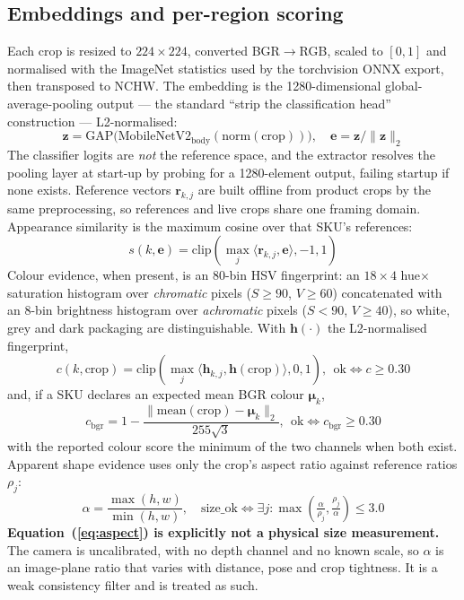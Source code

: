 \documentclass[conference]{IEEEtran}
\begin{document}
\subsection{Embeddings and per-region scoring}
Each crop is resized to $224\times224$, converted BGR$\rightarrow$RGB, scaled to $[0,1]$ and
normalised with the ImageNet statistics used by the torchvision ONNX export, then transposed to NCHW.
The embedding is the 1280-dimensional global-average-pooling output --- the standard
``strip the classification head'' construction --- L2-normalised:
\begin{equation}
\mathbf{z} = \mathrm{GAP}\big(\mathrm{MobileNetV2}_{\mathrm{body}}(\mathrm{norm}(\mathrm{crop}))\big),
\quad \mathbf{e} = \mathbf{z}/\lVert\mathbf{z}\rVert_2
\end{equation}
The classifier logits are \emph{not} the reference space, and the extractor resolves the pooling layer
at start-up by probing for a 1280-element output, failing startup if none exists. Reference vectors
$\mathbf{r}_{k,j}$ are built offline from product crops by the same preprocessing, so references and
live crops share one framing domain. Appearance similarity is the maximum cosine over that SKU's
references:
\begin{equation}
s(k,\mathbf{e}) = \mathrm{clip}\!\left(\max_j\langle\mathbf{r}_{k,j},\mathbf{e}\rangle,-1,1\right)
\end{equation}
Colour evidence, when present, is an 80-bin HSV fingerprint: an $18\times4$ hue$\times$saturation
histogram over \emph{chromatic} pixels ($S\ge90$, $V\ge60$) concatenated with an 8-bin brightness
histogram over \emph{achromatic} pixels ($S<90$, $V\ge40$), so white, grey and dark packaging are
distinguishable. With $\mathbf{h}(\cdot)$ the L2-normalised fingerprint,
\begin{equation}
c(k,\mathrm{crop}) = \mathrm{clip}\!\left(\max_j\langle\mathbf{h}_{k,j},
  \mathbf{h}(\mathrm{crop})\rangle,0,1\right),\ \ \text{ok} \iff c\ge0.30
\end{equation}
and, if a SKU declares an expected mean BGR colour $\boldsymbol{\mu}_k$,
\begin{equation}
c_{\mathrm{bgr}} = 1-\frac{\lVert\mathrm{mean}(\mathrm{crop})-\boldsymbol{\mu}_k\rVert_2}{255\sqrt{3}},
  \ \ \text{ok} \iff c_{\mathrm{bgr}}\ge0.30
\end{equation}
with the reported colour score the minimum of the two channels when both exist. Apparent shape
evidence uses only the crop's aspect ratio against reference ratios $\rho_j$:
\begin{equation}
\alpha = \frac{\max(h,w)}{\min(h,w)},\quad
\text{size\_ok} \iff \exists j:\max\!\left(\tfrac{\alpha}{\rho_j},\tfrac{\rho_j}{\alpha}\right)\le3.0
\label{eq:aspect}
\end{equation}
\textbf{Equation~(\ref{eq:aspect}) is explicitly not a physical size measurement.} The camera is
uncalibrated, with no depth channel and no known scale, so $\alpha$ is an image-plane ratio that
varies with distance, pose and crop tightness. It is a weak consistency filter and is treated as such.
\end{document}
